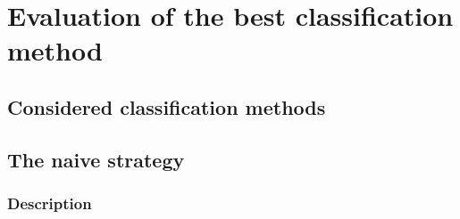\chapter{Evaluation of the best classification method}
\label{chap_classification}
\section{Considered classification methods}
\label{sec_considered_classif}
\section{The naive strategy}
\label{sec_naive_strat}
\subsection{Description}
